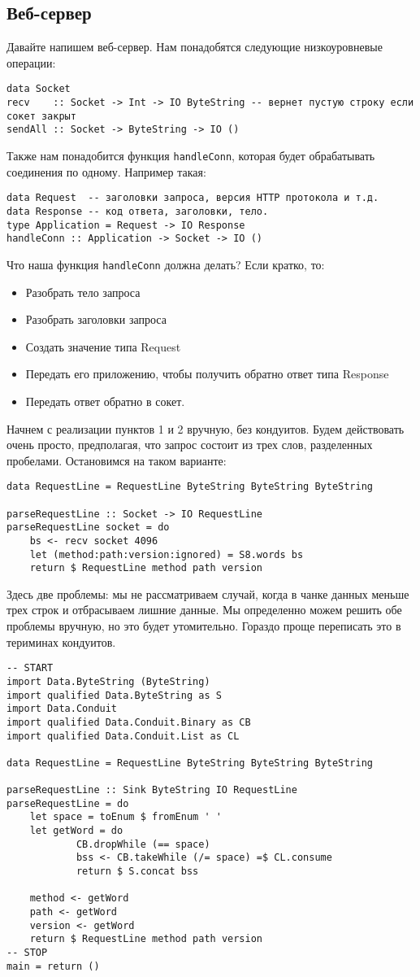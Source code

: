 \subsection{Веб-сервер}

Давайте напишем веб-сервер. Нам понадобятся следующие низкоуровневые операции:
\begin{lstlisting}
data Socket
recv    :: Socket -> Int -> IO ByteString -- вернет пустую строку если сокет закрыт
sendAll :: Socket -> ByteString -> IO ()
\end{lstlisting}
Также нам понадобится функция \lstinline'handleConn', которая будет обрабатывать 
соединения по одному. Например такая:
\begin{lstlisting}
data Request  -- заголовки запроса, версия HTTP протокола и т.д.
data Response -- код ответа, заголовки, тело.
type Application = Request -> IO Response
handleConn :: Application -> Socket -> IO ()
\end{lstlisting}
Что наша функция \lstinline'handleConn' должна делать? Если кратко, то:
\begin{itemize}  
\item   Разобрать тело запроса
\item   Разобрать заголовки запроса
\item   Создать значение типа Request
\item   Передать его приложению, чтобы получить обратно ответ типа Response
\item   Передать ответ обратно в сокет.
\end{itemize}  
Начнем с реализации пунктов 1 и 2 вручную, без кондуитов. Будем действовать очень 
просто, предполагая, что запрос состоит из трех слов, разделенных пробелами. 
Остановимся на таком варианте:
\begin{lstlisting}
data RequestLine = RequestLine ByteString ByteString ByteString

parseRequestLine :: Socket -> IO RequestLine
parseRequestLine socket = do
    bs <- recv socket 4096
    let (method:path:version:ignored) = S8.words bs
    return $ RequestLine method path version
\end{lstlisting}
Здесь две проблемы: мы не рассматриваем случай, когда в чанке данных меньше 
трех строк и отбрасываем лишние данные. Мы определенно можем решить обе 
проблемы вручную, но это будет утомительно. Гораздо проще переписать это 
в териминах кондуитов.
\begin{lstlisting}
-- START
import Data.ByteString (ByteString)
import qualified Data.ByteString as S
import Data.Conduit
import qualified Data.Conduit.Binary as CB
import qualified Data.Conduit.List as CL

data RequestLine = RequestLine ByteString ByteString ByteString

parseRequestLine :: Sink ByteString IO RequestLine
parseRequestLine = do
    let space = toEnum $ fromEnum ' '
    let getWord = do
            CB.dropWhile (== space)
            bss <- CB.takeWhile (/= space) =$ CL.consume
            return $ S.concat bss

    method <- getWord
    path <- getWord
    version <- getWord
    return $ RequestLine method path version
-- STOP
main = return ()
\end{lstlisting}
